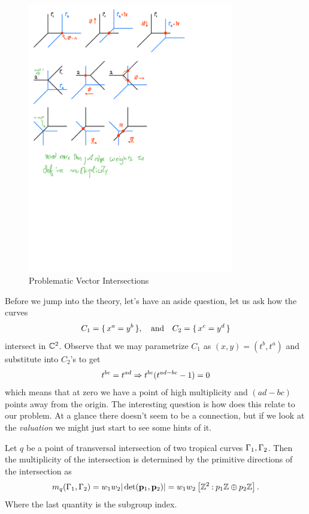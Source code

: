 \documentclass[12pt]{memoir}
\begin{document}
\begin{figure}[h!]
    \centering
    \includegraphics[width=0.8\textwidth, trim= 0.1cm 13cm 9cm 10.75cm,clip]{figs/fig11-3-4-and-5-VectorIntersections.pdf}
    \caption{Problematic Vector Intersections}
    \label{fig:11.5-NonWeightedVectorIntersection2}
\end{figure}

Before we jump into the theory, let's have an aside question, let us ask how the curves 
$$C_1=\{\,x^a=y^b\,\},\quad\text{and}\quad C_2=\{\,x^c=y^d\,\}$$
intersect in $\mathbb{C}^2$. Observe that we may parametrize $C_1$ as $(x,y)=(t^b,t^a)$ and substitute into $C_2$'s to get 
$$t^{bc}=t^{ad}\Rightarrow t^{bc}(t^{ad-bc}-1)=0$$ 
which means that at zero we have a point of high multiplicity and $(ad-bc)$ points away from the origin. The interesting question is how does this relate to our problem. At a glance there doesn't seem to be a connection, but if we look at the \emph{valuation} we might just start to see some hints of it.

\begin{Def}
    Let $q$ be a point of transversal intersection of two tropical curves $\Gamma_1,\Gamma_2$. Then the multiplicity of the intersection is determined by the primitive directions of the intersection as 
    $$m_q(\Gamma_1,\Gamma_2)=w_1w_2|\det(\mathbf{p}_1,\mathbf{p}_2)|=w_1w_2\left\lbrack\mathbb{Z}^2\mathbin{:} p_1\mathbb{Z}\oplus p_2\mathbb{Z}\right\rbrack.$$
    Where the last quantity is the subgroup index. %
\end{Def}
\end{document}

